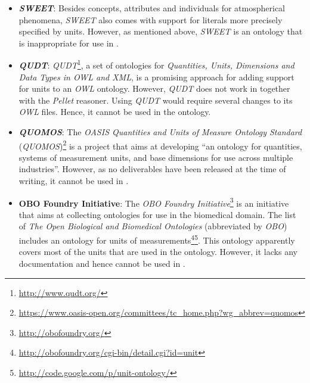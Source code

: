 \begin{itemize}
  \item \textbf{\emph{SWEET}}: Besides concepts, attributes and individuals for atmospherical phenomena, \emph{SWEET} also comes with support for literals more precisely specified by units. However, as mentioned above, \emph{SWEET} is an ontology that is inappropriate for use in \thinkhomeweather.
  
  \item \textbf{\emph{QUDT}}: \emph{QUDT}\footnote{\href{http://www.qudt.org/}{http://www.qudt.org/}}, a set of ontologies for \emph{Quantities, Units, Dimensions and Data Types in OWL and XML}, is a promising approach for adding support for units to an \emph{OWL} ontology. However, \emph{QUDT} does not work in \protege together with the \emph{Pellet} reasoner. Using \emph{QUDT} would require several changes to its \emph{OWL} files. Hence, it cannot be used in the \thinkhomeweather ontology.
  
  \item \textbf{\emph{QUOMOS}}: The \emph{OASIS Quantities and Units of Measure Ontology Standard} (\emph{QUOMOS})\footnote{\href{https://www.oasis-open.org/committees/tc\_home.php?wg\_abbrev=quomos}{https://www.oasis-open.org/committees/tc\_home.php?wg\_abbrev=quomos}} is a project that aims at developing ``an ontology for quantities, systems of measurement units, and base dimensions for use across multiple industries''. However, as no deliverables have been released at the time of writing, it cannot be used in \thinkhomeweather.
  
  \item \textbf{OBO Foundry Initiative}: The \emph{OBO Foundry Initiative}\footnote{\href{http://obofoundry.org/}{http://obofoundry.org/}} is an initiative that aims at collecting ontologies for use in the biomedical domain. The list of \emph{The Open Biological and Biomedical Ontologies} (abbreviated by \emph{OBO}) includes an ontology for units of measurements\footnote{\href{http://obofoundry.org/cgi-bin/detail.cgi?id=unit}{http://obofoundry.org/cgi-bin/detail.cgi?id=unit}}\footnote{\href{http://code.google.com/p/unit-ontology/}{http://code.google.com/p/unit-ontology/}}. This ontology apparently covers most of the units that are used in the \thinkhomeweather ontology. However, it lacks any documentation and hence cannot be used in \thinkhomeweather.
  

\end{itemize}
